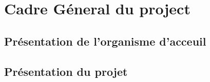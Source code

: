 
\chapter{Cadre G\'eneral du project}
\section{Présentation de l'organisme d'acceuil}
\section{Présentation du projet}